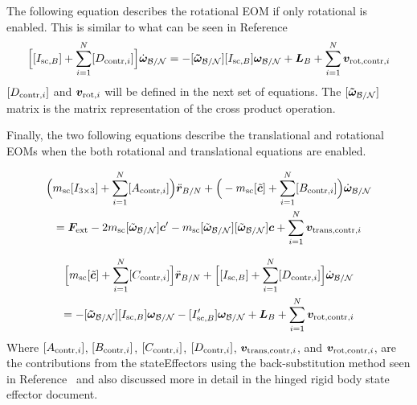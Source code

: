 The following equation describes the rotational EOM if only rotational is enabled. This is similar to what can be seen in Reference~\cite{schaub} 
\begin{equation}
\Big[[I_{\text{sc},B}]+\sum\limits_{i=1}^{N} [D_{\textnormal{contr},i}]\Big] \dot{\bm\omega}_{\cal B/N} = - [\bm{\tilde{\omega}}_{\cal B/N}] [I_{\text{sc},B}] \bm\omega_{\cal B/N} + \bm{L}_B +\sum\limits_{i=1}^{N} \bm v_{\textnormal{rot,contr},i}
	\label{eq:Final6}
\end{equation}
$[D_{\textnormal{contr},i}]$ and $\bm v_{\textnormal{rot},i}$ will be defined in the next set of equations. The $[\bm{\tilde{\omega}}_{\cal B/N}]$ matrix is the matrix representation of the cross product operation.

Finally, the two following equations describe the translational and rotational EOMs when the both rotational and translational equations are enabled. 

\begin{multline}
\Big(m_{\text{sc}} [I_{3\times3}] +\sum_{i=1}^{N}[A_{\textnormal{contr},i}]\Big)\ddot{\bm r}_{B/N}+\Big(-m_{\text{sc}} [\tilde{\bm{c}}] +\sum_{i=1}^{N}[B_{\textnormal{contr},i}]\Big) \dot{\bm\omega}_{\cal B/N} \\
= \bm F_{\textnormal{ext}} 	- 2 m_{\text{sc}} [\tilde{\bm\omega}_{\cal B/N}] \bm c'
-m_{\text{sc}} [\tilde{\bm\omega}_{\cal B/N}][\tilde{\bm\omega}_{\cal B/N}]\bm{c}
+\sum_{i=1}^{N}\bm v_{\textnormal{trans,contr},i}
\label{eq:Rbddot8}
\end{multline}

\begin{multline}
\Big[m_{\text{sc}}[\tilde{\bm{c}}] +\sum\limits_{i=1}^{N}[C_{\textnormal{contr},i}]\Big]\ddot{\bm r}_{B/N}+\Big[[I_{\text{sc},B}]+\sum\limits_{i=1}^{N}[D_{\textnormal{contr},i}]\Big]\dot{\bm\omega}_{\cal B/N}
\\
= -[\bm{\tilde{\omega}}_{\cal B/N}] [I_{\text{sc},B}] \bm\omega_{\cal B/N} 
- [I'_{\text{sc},B}] \bm\omega_{\cal B/N} + \bm{L}_B +\sum\limits_{i=1}^{N}\bm v_{\textnormal{rot,contr},i}
\label{eq:Final9}
\end{multline}	
Where $[A_{\textnormal{contr},i}]$, $[B_{\textnormal{contr},i}]$, $[C_{\textnormal{contr},i}]$, $[D_{\textnormal{contr},i}]$, $\bm v_{\textnormal{trans,contr},i}$, and $\bm v_{\textnormal{rot,contr},i}$, are the contributions from the stateEffectors using the back-substitution method seen in Reference~\cite{Allard2016rz} and also discussed more in detail in the hinged rigid body state effector document.

